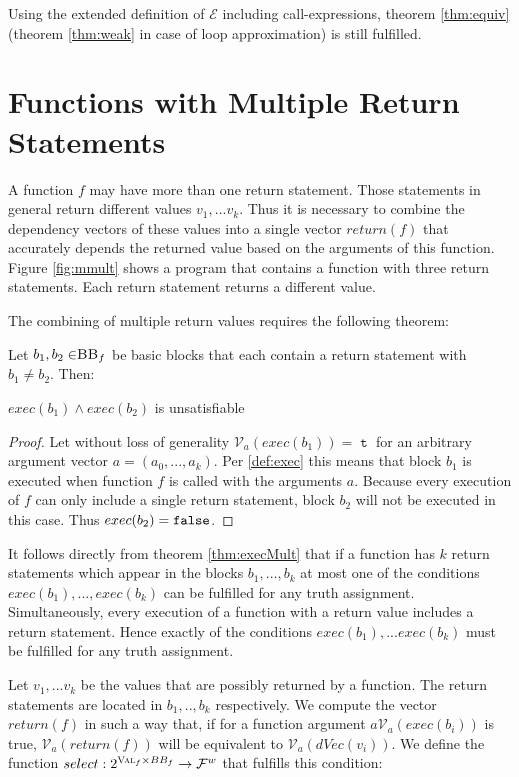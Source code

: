 \begin{lemma}
Using the extended definition of $\mathcal{E}$ including call-expressions, theorem \ref{thm:equiv} (theorem \ref{thm:weak} in case of loop approximation) is still fulfilled.
\end{lemma}

\section{Functions with Multiple Return Statements}

A function $f$ may have more than one return statement. Those statements in general return different values $v_1, ... v_k$. Thus it is necessary to combine the dependency vectors of these values into a single vector $return(f)$ that accurately depends the returned value based on the arguments of this function. Figure \ref{fig:mmult} shows a program that contains a function with three return statements. Each return statement returns a different value.

The combining of multiple return values requires the following theorem:

\begin{theorem}\label{thm:execMult}
    Let $b_1, b_2 \in \mbb_f$ be basic blocks that each contain a return statement with $b_1 \neq b_2$. Then:
    \begin{center}
        $exec(b_1) \land exec(b_2)$ is unsatisfiable
    \end{center}
\end{theorem}

\begin{proof}
Let without loss of generality $\mathcal{V}_a (exec(b_1)) = \mttt$ for an arbitrary argument vector $a = (a_0, ..., a_k)$. Per \ref{def:exec} this means that block $b_1$ is executed when function $f$ is called with the arguments $a$. Because every execution of $f$ can only include a single return statement, block $b_2$ will not be executed in this case. Thus $exec(b_2) = \mathtt{false}$.
\end{proof}
It follows directly from theorem \ref{thm:execMult} that if a function has $k$ return statements which appear in the blocks $b_1, ..., b_k$ at most one of the conditions $exec(b_1),..., exec(b_k)$ can be fulfilled for any truth assignment. Simultaneously, every execution of a function with a return value includes a return statement. Hence exactly of the conditions $exec(b_1),... exec(b_k)$ must be fulfilled for any truth assignment.

Let $v_1, ... v_k$ be the values that are possibly returned by a function. The return statements are located in $b_1, .., b_k$ respectively. We compute the vector $return(f)$ in such a way that, if for a function argument $a \mathcal{V}_a(exec(b_i))$ is true, $\mathcal{V}_a(return(f))$ will be equivalent to $\mathcal{V}_a(dVec(v_i))$. We define the function $select: 2^{\textsc{Val}_f \times BB_f} \to \mathcal{F}^w$ that fulfills this condition:


